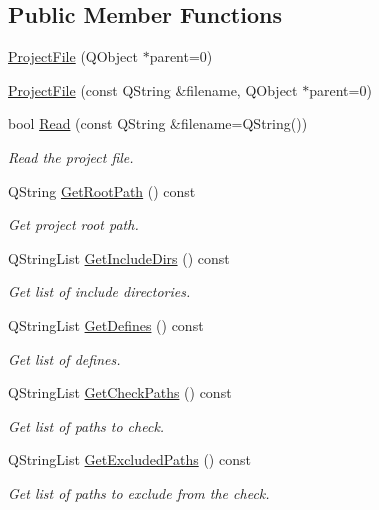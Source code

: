 \subsection*{Public Member Functions}
\begin{DoxyCompactItemize}
\item 
\hyperlink{class_project_file_a0de7dba3827b1bed72eb7e4228baeaf3}{Project\-File} (Q\-Object $\ast$parent=0)
\item 
\hyperlink{class_project_file_a8ee47ddffd45f5443ebd661efb7c763d}{Project\-File} (const Q\-String \&filename, Q\-Object $\ast$parent=0)
\item 
bool \hyperlink{class_project_file_a66e7c033164c37dd9c0bab575585f4c5}{Read} (const Q\-String \&filename=Q\-String())
\begin{DoxyCompactList}\small\item\em Read the project file. \end{DoxyCompactList}\item 
Q\-String \hyperlink{class_project_file_a1bcc5f6cbcb46d9da953435a42fe0588}{Get\-Root\-Path} () const 
\begin{DoxyCompactList}\small\item\em Get project root path. \end{DoxyCompactList}\item 
Q\-String\-List \hyperlink{class_project_file_a99eaeaf63d9af7a53859bfbef27f4f53}{Get\-Include\-Dirs} () const 
\begin{DoxyCompactList}\small\item\em Get list of include directories. \end{DoxyCompactList}\item 
Q\-String\-List \hyperlink{class_project_file_ae85e1bc32f973becb0507a222fe00002}{Get\-Defines} () const 
\begin{DoxyCompactList}\small\item\em Get list of defines. \end{DoxyCompactList}\item 
Q\-String\-List \hyperlink{class_project_file_af322bc9b9a12583cee1ce2957d642b2a}{Get\-Check\-Paths} () const 
\begin{DoxyCompactList}\small\item\em Get list of paths to check. \end{DoxyCompactList}\item 
Q\-String\-List \hyperlink{class_project_file_a1acacd36addf3a5b7df2efc72dae939a}{Get\-Excluded\-Paths} () const 
\begin{DoxyCompactList}\small\item\em Get list of paths to exclude from the check. \end{DoxyCompactList}\item 

\end{DoxyCompactItemize}
